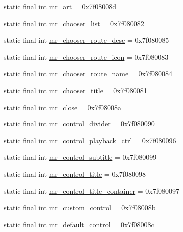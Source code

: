 \begin{CompactItemize}
static final int \hyperlink{classandroid_1_1support_1_1transition_1_1_r_1_1id_db7b1115ed1a475dba93ebd2ea685632}{mr\_\-art} = 0x7f08008d
\item 
static final int \hyperlink{classandroid_1_1support_1_1transition_1_1_r_1_1id_bd90f7b8aba939f38805a3734b5fa1ce}{mr\_\-chooser\_\-list} = 0x7f080082
\item 
static final int \hyperlink{classandroid_1_1support_1_1transition_1_1_r_1_1id_6a5714f4a260e462ed4ed7c9c2356caa}{mr\_\-chooser\_\-route\_\-desc} = 0x7f080085
\item 
static final int \hyperlink{classandroid_1_1support_1_1transition_1_1_r_1_1id_eb9712c8d46b22e7778bfad17cf43494}{mr\_\-chooser\_\-route\_\-icon} = 0x7f080083
\item 
static final int \hyperlink{classandroid_1_1support_1_1transition_1_1_r_1_1id_221e09f6c2f01310f7316607ffb4cf28}{mr\_\-chooser\_\-route\_\-name} = 0x7f080084
\item 
static final int \hyperlink{classandroid_1_1support_1_1transition_1_1_r_1_1id_ebd6a8bbd6a3c9a5f5bcba69a80c8cad}{mr\_\-chooser\_\-title} = 0x7f080081
\item 
static final int \hyperlink{classandroid_1_1support_1_1transition_1_1_r_1_1id_03e8c08509bc7530da4fe3e65adcb654}{mr\_\-close} = 0x7f08008a
\item 
static final int \hyperlink{classandroid_1_1support_1_1transition_1_1_r_1_1id_88bbee383f976d98db7609cee5595eee}{mr\_\-control\_\-divider} = 0x7f080090
\item 
static final int \hyperlink{classandroid_1_1support_1_1transition_1_1_r_1_1id_a02309dc9276beee5ba1258640fd54e5}{mr\_\-control\_\-playback\_\-ctrl} = 0x7f080096
\item 
static final int \hyperlink{classandroid_1_1support_1_1transition_1_1_r_1_1id_bb88044fd3e75024bd8d898103a66690}{mr\_\-control\_\-subtitle} = 0x7f080099
\item 
static final int \hyperlink{classandroid_1_1support_1_1transition_1_1_r_1_1id_5879d94f0b640e017ab868e1b418914c}{mr\_\-control\_\-title} = 0x7f080098
\item 
static final int \hyperlink{classandroid_1_1support_1_1transition_1_1_r_1_1id_b432c437e4022e712c08cf3814489de1}{mr\_\-control\_\-title\_\-container} = 0x7f080097
\item 
static final int \hyperlink{classandroid_1_1support_1_1transition_1_1_r_1_1id_8bfdf3ead863003f388162925f28b1dd}{mr\_\-custom\_\-control} = 0x7f08008b
\item 
static final int \hyperlink{classandroid_1_1support_1_1transition_1_1_r_1_1id_785180b83ebe6059f60245cd1339c6c7}{mr\_\-default\_\-control} = 0x7f08008c

\end{CompactItemize}
